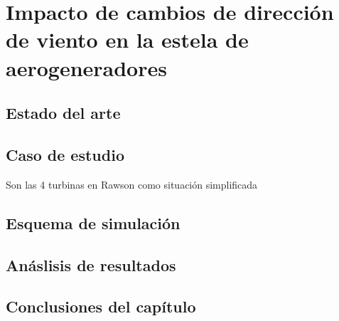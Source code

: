 \chapter{Impacto de cambios de dirección de viento en la estela de aerogeneradores}

\section{Estado del arte}

\section{Caso de estudio}

Son las 4 turbinas en Rawson como situación simplificada

\section{Esquema de simulación}

\section{Anáslisis de resultados}

\section{Conclusiones del capítulo}


